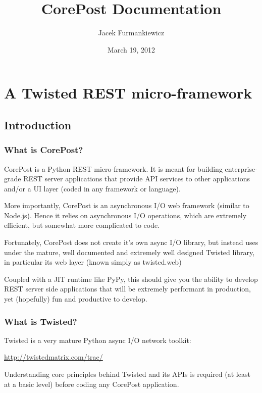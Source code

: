 \documentclass[letterpaper,10pt,english]{sphinxmanual}
\title{CorePost Documentation}
\date{March 19, 2012}
\author{Jacek Furmankiewicz}
\begin{document}
\maketitle
\tableofcontents
{}\label{index::doc}



\chapter{A Twisted REST micro-framework}
\label{index:a-twisted-rest-micro-framework}\label{index:corepost}

\section{Introduction}
\label{intro:introduction}\label{intro::doc}

\subsection{What is CorePost?}
\label{intro:what-is-corepost}
CorePost is a Python REST micro-framework. It is meant for building enterprise-grade REST server applications that provide
API services to other applications and/or a UI layer (coded in any framework or language).

More importantly, CorePost is an asynchronous I/O web framework (similar to Node.js).
Hence it relies on asynchronous I/O operations, which are extremely efficient, but somewhat more complicated to code.

Fortunately, CorePost does not create it's own async I/O library, but instead uses under the mature, well documented
and extremely well designed Twisted library, in particular its web layer (known simply as twisted.web)

Coupled with a JIT runtime like PyPy, this should give you the ability to develop REST server side applications
that will be extremely performant in production, yet (hopefully) fun and productive to develop.


\subsection{What is Twisted?}
\label{intro:what-is-twisted}
Twisted is a very mature Python async I/O network toolkit:

\href{http://twistedmatrix.com/trac/}{http://twistedmatrix.com/trac/}

Understanding core principles behind Twisted and its APIs is required (at least at a basic level) before coding any CorePost application.
\end{document}
